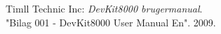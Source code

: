	\fancyhead[CE,CO]{}
\renewcommand{\bibname}{Litteraturliste}
\begin{thebibliography}{2}

 Timll Technic Inc: \textit{DevKit8000 brugermanual}. \\ 
"Bilag 001 - DevKit8000 User Manual En". 2009. %

\end{thebibliography}